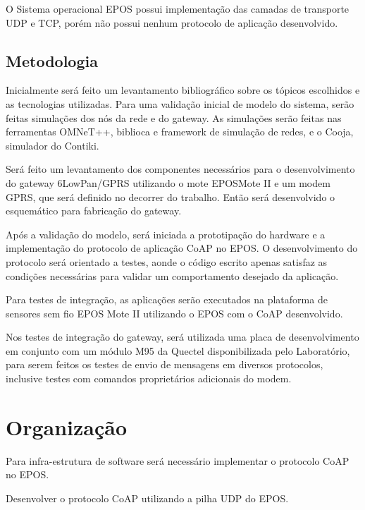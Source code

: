 O Sistema operacional EPOS possui implementa\c{c}\~ao das camadas de transporte UDP e TCP, por\'em n\~ao possui nenhum protocolo de aplica\c{c}\~ao desenvolvido.

\subsection{Metodologia}

Inicialmente ser\'a feito um levantamento bibliogr\'afico sobre os t\'opicos escolhidos e as tecnologias utilizadas. Para uma valida\c{c}\~ao inicial de modelo do sistema, ser\~ao feitas simula\c{c}\~oes dos n\'os da rede e do gateway. As simula\c{c}\~oes ser\~ao feitas nas ferramentas OMNeT++, biblioca e framework de simula\c{c}\~ao de redes, e o Cooja, simulador do Contiki.

Ser\'a feito um levantamento dos componentes necess\'arios para o desenvolvimento do gateway 6LowPan/GPRS utilizando o mote EPOSMote II e um modem GPRS, que ser\'a definido no decorrer do trabalho. Ent\~ao ser\'a desenvolvido o esquem\'atico para fabrica\c{c}\~ao do gateway.

Ap\'os a valida\c{c}\~ao do modelo, ser\'a iniciada a prototipa\c{c}\~ao do hardware e a implementa\c{c}\~ao do protocolo de aplica\c{c}\~ao CoAP no EPOS. O desenvolvimento do protocolo ser\'a orientado a testes, aonde o c\'odigo escrito apenas satisfaz as condi\c{c}\~oes necess\'arias para validar um comportamento desejado da aplica\c{c}\~ao.

Para testes de integra\c{c}\~ao, as aplica\c{c}\~oes ser\~ao executados na plataforma de sensores sem fio EPOS Mote II utilizando o EPOS com o CoAP desenvolvido.

Nos testes de integra\c{c}\~ao do gateway, ser\'a utilizada uma placa de desenvolvimento em conjunto com um m\'odulo M95 da Quectel disponibilizada pelo Laborat\'orio, para serem feitos os testes de envio de mensagens em diversos protocolos, inclusive testes com comandos propriet\'arios adicionais do modem.


\section{Organiza\c{c}\~ao}

Para infra-estrutura de software ser\'a necess\'ario implementar o protocolo CoAP no EPOS.

Desenvolver o protocolo CoAP utilizando a pilha UDP do EPOS.
